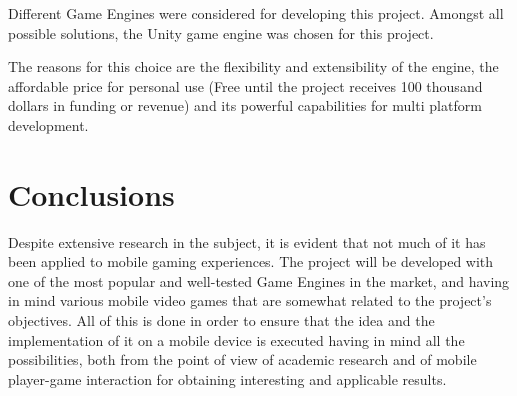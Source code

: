 Different Game Engines were considered for developing this project. Amongst  all possible solutions, the Unity game engine was chosen for this project.

The reasons for this choice are the flexibility and extensibility of the engine, the affordable price for personal use (Free until the project receives 100 thousand dollars in funding or revenue) and its powerful capabilities for multi platform development.  

\section{Conclusions}

Despite extensive research in the subject, it is evident that not much of it has been applied to mobile gaming experiences. The project will be developed with one of the most popular and well-tested Game Engines in the market, and having in mind various mobile video games that are somewhat related to the project's objectives. All of this is done in order to ensure that the idea and the implementation of it on a mobile device is executed having in mind all the possibilities, both from the point of view of academic research and of mobile player-game interaction for obtaining interesting and applicable results.
